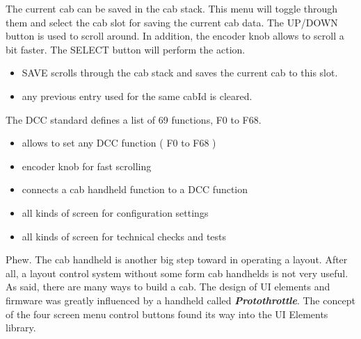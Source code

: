 
The current cab can be saved in the cab stack. This menu will toggle through them and select the cab slot for saving the current cab data. The UP/DOWN button is used to scroll around. In addition, the encoder knob allows to scroll a bit faster. The SELECT button will perform the action.

\begin{itemize}
\item SAVE scrolls through the cab stack and saves the current cab to this slot.
\item any previous entry used for the same cabId is cleared.
\end{itemize}


The DCC standard defines a list of 69 functions, F0 to F68.

\begin{itemize}
\item allows to set any DCC function ( F0 to F68 )
\item encoder knob for fast scrolling
\end{itemize}


\begin{itemize}
\item connects a cab handheld function to a DCC function
\end{itemize}


\begin{itemize}
\item all kinds of screen for configuration settings
\end{itemize}


\begin{itemize}
\item all kinds of screen for technical checks and tests
\end{itemize}


Phew. The cab handheld is another big step toward in operating a layout. After all, a layout control system without some form cab handhelds is not very useful. As said, there are many ways to build a cab. The design of UI elements and firmware was greatly influenced by a handheld called \textbf{\textit{Protothrottle}}. The concept of the four screen menu control buttons found its way into the UI Elements library.

